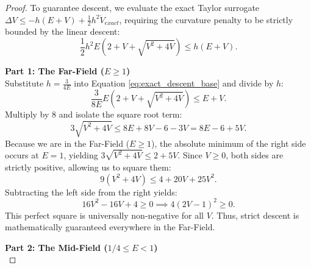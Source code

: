 \begin{proof}
To guarantee descent, we evaluate the exact Taylor surrogate $\Delta V \le -h(E+V) + \frac{1}{2}h^2 \ddot{V}_{exact}$, requiring the curvature penalty to be strictly bounded by the linear descent:
\begin{equation} \label{eq:exact_descent_base}
    \frac{1}{2}h^2 E \left( 2 + V + \sqrt{V^2+4V} \right) \le h(E+V).
\end{equation}

\textbf{Part 1: The Far-Field ($E \ge 1$)} \\
Substitute $h = \frac{3}{4E}$ into Equation \ref{eq:exact_descent_base} and divide by $h$:
\begin{equation}
    \frac{3}{8E} E \left( 2 + V + \sqrt{V^2+4V} \right) \le E+V.
\end{equation}
Multiply by 8 and isolate the square root term:
\begin{equation}
    3\sqrt{V^2+4V} \le 8E + 8V - 6 - 3V = 8E - 6 + 5V.
\end{equation}
Because we are in the Far-Field ($E \ge 1$), the absolute minimum of the right side occurs at $E=1$, yielding $3\sqrt{V^2+4V} \le 2 + 5V$. Since $V \ge 0$, both sides are strictly positive, allowing us to square them:
\begin{equation}
    9(V^2 + 4V) \le 4 + 20V + 25V^2.
\end{equation}
Subtracting the left side from the right yields:
\begin{equation}
    16V^2 - 16V + 4 \ge 0 \implies 4(2V-1)^2 \ge 0.
\end{equation}
This perfect square is universally non-negative for all $V$. Thus, strict descent is mathematically guaranteed everywhere in the Far-Field.

\textbf{Part 2: The Mid-Field ($1/4 \le E < 1$)} \\


\end{proof}
